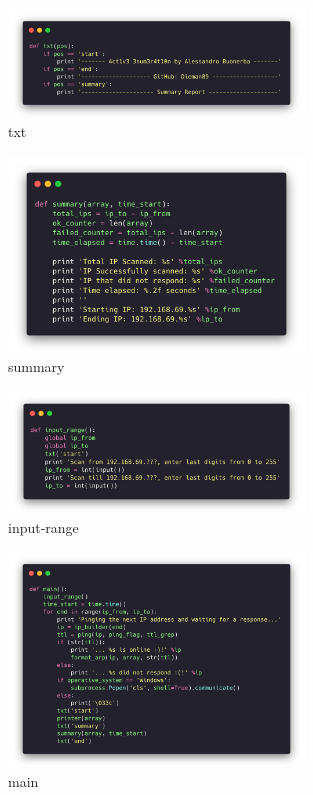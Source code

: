 \begin{figure}[H]
  \centering
  \includegraphics[width=0.7\textwidth]{figures/code/txt}
  \caption{txt}
  \label{f:txt}
\end{figure}

\begin{figure}[H]
  \centering
  \includegraphics[width=0.7\textwidth]{figures/code/summary}
  \caption{summary}
  \label{f:summary}
\end{figure}

\begin{figure}[H]
  \centering
  \includegraphics[width=0.7\textwidth]{figures/code/input-range}
  \caption{input-range}
  \label{f:input-range}
\end{figure}

\begin{figure}[H]
  \centering
  \includegraphics[width=0.7\textwidth]{figures/code/main}
  \caption{main}
  \label{f:main}
\end{figure}

